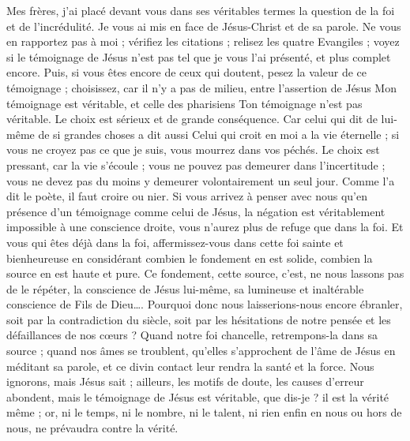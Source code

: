 Mes frères, j’ai placé devant vous dans ses véritables termes la question de la foi et de l’incrédulité. Je vous ai mis en face de Jésus-Christ et de sa parole. Ne vous en rapportez pas à moi ; vérifiez les citations ; relisez les quatre Evangiles ; voyez si le témoignage de Jésus n’est pas tel que je vous l’ai présenté, et plus complet encore. Puis, si vous êtes encore de ceux qui doutent, pesez la valeur de ce témoignage ; choisissez, car il n’y a pas de milieu, entre l’assertion de Jésus\frcolon{} \Og{} Mon témoignage est véritable\Fg{}, et celle des pharisiens\frcolon{} \Og{} Ton témoignage n’est pas véritable.\Fg{} Le choix est sérieux et de grande conséquence. Car celui qui dit de lui-même de si grandes choses a dit aussi\frcolon{} \Og{} Celui qui croit en moi a la vie éternelle ; si vous ne croyez pas ce que je suis, vous mourrez dans vos péchés.\Fg{} Le choix est pressant, car la vie s’écoule ; vous ne pouvez pas demeurer dans l’incertitude ; vous ne devez pas du moins y demeurer volontairement un seul jour. Comme l’a dit le poète, il faut croire ou nier. Si vous arrivez à penser avec nous qu’en présence d’un témoignage comme celui de Jésus, la négation est véritablement impossible à une conscience droite, vous n’aurez plus de refuge que dans la foi. Et vous qui êtes déjà dans la foi, affermissez-vous dans cette foi sainte et bienheureuse en considérant combien le fondement en est solide, combien la source en est haute et pure. Ce fondement, cette source, c’est, ne nous lassons pas de le répéter, la conscience de Jésus lui-même, sa lumineuse et inaltérable conscience de Fils de Dieu…. Pourquoi donc nous laisserions-nous encore ébranler, soit par la contradiction du siècle, soit par les hésitations de notre pensée et les défaillances de nos cœurs ? Quand notre foi chancelle, retrempons-la dans sa source ; quand nos âmes se troublent, qu’elles s’approchent de l’âme de Jésus en méditant sa parole, et ce divin contact leur rendra la santé et la force. Nous ignorons, mais Jésus sait ; ailleurs, les motifs de doute, les causes d’erreur abondent, mais le témoignage de Jésus est véritable, que dis-je ? il est la vérité même ; or, ni le temps, ni le nombre, ni le talent, ni rien enfin en nous ou hors de nous, ne prévaudra contre la vérité.

